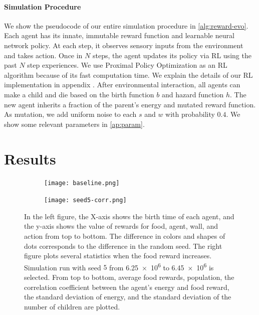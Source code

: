 \paragraph{Simulation Procedure}
We show the pseudocode of our entire simulation procedure in \cref{alg:reward-evo}. Each agent has its innate, immutable reward function and learnable neural network policy. At each step, it observes sensory inputs from the environment and takes action. Once in $N$ steps, the agent updates its policy via RL using the past $N$ step experiences. We use Proximal Policy Optimization \citep{schulmanProximalPolicyOptimization2017} as an RL algorithm because of its fast computation time. We explain the details of our RL implementation in appendix . After environmental interaction, all agents can make a child and die based on the birth function $b$ and hazard function $h$. The new agent inherits a fraction of the parent's energy and mutated reward function. As mutation, we add uniform noise to each $s$ and $w$ with probability $0.4$. We show some relevant parameters in \cref{ap:param}.

\section{Results}

\begin{figure}[t]
  \begin{subfigure}[t]{7.5cm}
    \centering
    \texttt{[image: baseline.png]}
    \label{subfigure:bl}
  \end{subfigure}
  \begin{subfigure}[t]{6.4cm}
    \centering
    \texttt{[image: seed5-corr.png]}
    \label{subfigure:s5corr}
  \end{subfigure}
  \caption{
    In the left figure, the X-axis shows the birth time of each agent, and the y-axis shows the value of rewards for food, agent, wall, and action from top to bottom. The difference in colors and shapes of dots corresponds to the difference in the random seed. The right figure plots several statistics when the food reward increases. Simulation run with seed $5$ from \num{6.25e6} to \num{6.45e6} is selected. From top to bottom, average food rewards, population, the correlation coefficient between the agent's energy and food reward, the standard deviation of energy, and the standard deviation of the number of children are plotted.
  }\label{figure:baseline-result}
\end{figure}

